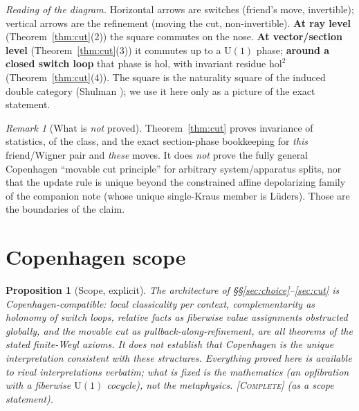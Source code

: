 \documentclass[11pt]{article}
\newtheorem{proposition}{Proposition}
\theoremstyle{definition}
\theoremstyle{remark}
\newtheorem*{remark}{Remark}
\newcommand{\U}{\mathrm{U}}
\newcommand{\hol}{\mathrm{hol}}
\newcommand{\pushf}[1]{{#1}_{!}}
\newcommand{\STC}{{\normalfont\textsc{[Complete]}}}
\begin{document}
\begin{center}
\end{center}
\noindent\emph{Reading of the diagram.} Horizontal arrows are switches (friend's move,
invertible); vertical arrows are the refinement (moving the cut, non-invertible).
\textbf{At ray level} (Theorem~\ref{thm:cut}(2)) the square commutes on the nose.
\textbf{At vector/section level} (Theorem~\ref{thm:cut}(3)) it commutes up to a $\U(1)$
phase; \textbf{around a closed switch loop} that phase is $\hol$, with invariant residue
$\hol^2$ (Theorem~\ref{thm:cut}(4)). The square is the naturality square of the induced
double category (Shulman \cite{Shulman}); we use it here only as a picture of the exact
statement.

\begin{remark}[What is \emph{not} proved]
Theorem~\ref{thm:cut} proves invariance of statistics, of the class, and the exact
section-phase bookkeeping for \emph{this} friend/Wigner pair and \emph{these} moves. It
does \emph{not} prove the fully general Copenhagen ``movable cut principle'' for
arbitrary system/apparatus splits, nor that the update rule is unique beyond the
constrained affine depolarizing family of the companion note (whose unique single-Kraus
member is L\"uders). Those are the boundaries of the claim.
\end{remark}

\section{Copenhagen scope}\label{sec:copenhagen}

\begin{proposition}[Scope, explicit]\label{prop:scope}
The architecture of \S\S\ref{sec:choice}--\ref{sec:cut} is
\emph{Copenhagen-compatible}: local classicality per context, complementarity as
holonomy of switch loops, relative facts as fiberwise value assignments obstructed
globally, and the movable cut as pullback-along-refinement, are all theorems of the
stated finite-Weyl axioms. It does \emph{not} establish that Copenhagen is the unique
interpretation consistent with these structures. Everything proved here is available to
rival interpretations verbatim; what is fixed is the mathematics (an opfibration with a
fiberwise $\U(1)$ cocycle), not the metaphysics. \STC{} (as a scope statement).
\end{proposition}
\end{document}
